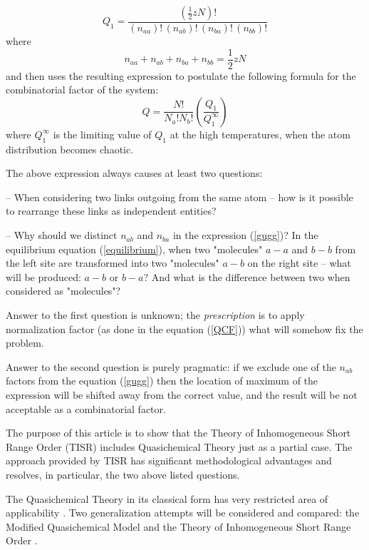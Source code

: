 \documentclass[12pt,abstract]{scrartcl}
\begin{document}
\begin{equation} \label{gugg}
Q_1 = \frac{(\frac{1}{2} zN)!}{(n_{aa})! \,(n_{ab})!\,  (n_{ba})! \,(n_{bb})!}
\end{equation} 
where 
\begin{equation} \label{n_summ}
n_{aa} + n_{ab} + n_{ba} + n_{bb} = \frac{1}{2}z N
\end{equation} 
 and then uses the resulting expression to postulate the following formula for the combinatorial factor of the system:
\begin{equation} \label{QCF}
Q = \frac{N!}{N_a! N_b! } \left(\frac{Q_1}{Q_1^\infty}\right)
\end{equation}
where $Q_1^\infty$ is the limiting value of $Q_1$ at the high temperatures, when the atom distribution becomes chaotic.

The above expression always causes at least two questions:

-- When considering two links outgoing from the same atom    -- how is it possible to rearrange these links as independent entities?

-- Why should we distinct $n_{ab} $ and $n_{ba}$ in the expression (\ref{gugg})? In the equilibrium equation (\ref{equilibrium}), when two "molecules" $a-a$  and $b-b$ from the left site are transformed into two "molecules" $a-b$ on the right site -- what will be produced:  $a-b$ or $b-a$? And what is the difference between two when considered as "molecules"?


Answer to the first question is unknown; the \textit{prescription} is to apply normalization factor (as done in the equation (\ref{QCF})) what  will somehow fix the problem.

Answer to the second question is purely pragmatic: if we exclude one of the $n_{ab}$ factors from the equation (\ref{gugg})   then  the location of maximum of the expression will be shifted away from the correct value, and the result will be not acceptable as a combinatorial factor.

The purpose of this article is to show that  the Theory of Inhomogeneous Short Range Order (TISR)  \cite{TISR_p1} includes Quasichemical Theory just as a partial case. The approach provided by TISR has significant methodological advantages and resolves, in particular, the two above listed questions. 

The Quasichemical Theory in its classical form has very restricted area of applicability \cite{Hillert2008}. Two generalization attempts will be considered and compared: the Modified Quasichemical Model \cite{Pelton1986,Pelton2007, Pelton_p1} and the Theory of Inhomogeneous Short Range Order  \cite{TISR_p1}.
\end{document}
